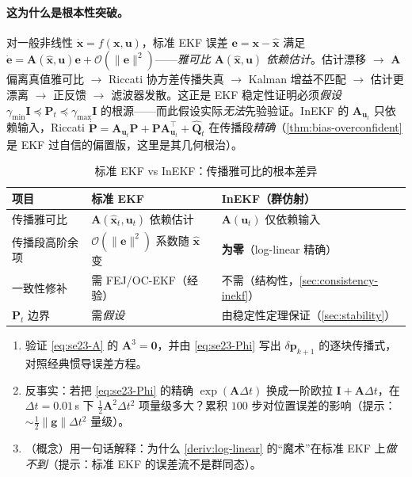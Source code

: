 \paragraph{这为什么是根本性突破。}对一般非线性 $\dot{\mathbf{x}}=f(\mathbf{x},\mathbf{u})$，标准 EKF 误差 $\mathbf{e}=\mathbf{x}-\hat{\mathbf{x}}$ 满足 $\dot{\mathbf{e}}=\mathbf{A}(\hat{\mathbf{x}},\mathbf{u})\mathbf{e}+\mathcal{O}(\|\mathbf{e}\|^2)$——\emph{雅可比 $\mathbf{A}(\hat{\mathbf{x}},\mathbf{u})$ 依赖估计}。估计漂移 $\to$ $\mathbf{A}$ 偏离真值雅可比 $\to$ Riccati 协方差传播失真 $\to$ Kalman 增益不匹配 $\to$ 估计更漂离 $\to$ 正反馈 $\to$ 滤波器发散。这正是 EKF 稳定性证明必须\emph{假设} $\gamma_{\min}\mathbf{I}\preceq\mathbf{P}_t\preceq\gamma_{\max}\mathbf{I}$ 的根源——而此假设实际\emph{无法}先验验证。InEKF 的 $\mathbf{A}_{\mathbf{u}_t}$ 只依赖输入，Riccati $\dot{\mathbf{P}}=\mathbf{A}_{\mathbf{u}_t}\mathbf{P}+\mathbf{P}\mathbf{A}_{\mathbf{u}_t}^\top+\hat{\mathbf{Q}}_t$ 在传播段\emph{精确}（\cref{thm:bias-overconfident} 是 EKF 过自信的偏置版，这里是其几何根治）。

\begin{table}[H]\centering\small
\caption{标准 EKF vs InEKF：传播雅可比的根本差异}
\label{tab:ekf-vs-inekf}
\begin{tabular}{lll}
\toprule
项目 & 标准 EKF & InEKF（群仿射） \\
\midrule
传播雅可比 & $\mathbf{A}(\hat{\mathbf{x}}_t,\mathbf{u}_t)$ 依赖估计 & $\mathbf{A}(\mathbf{u}_t)$ 仅依赖输入 \\
传播段高阶余项 & $\mathcal{O}(\|\mathbf{e}\|^2)$ 系数随 $\hat{\mathbf{x}}$ 变 & \textbf{为零}（log-linear 精确） \\
一致性修补 & 需 FEJ/OC-EKF（经验） & 不需（结构性，\cref{sec:consistency-inekf}） \\
$\mathbf{P}_t$ 边界 & 需\emph{假设} & 由稳定性定理保证（\cref{sec:stability}） \\
\bottomrule
\end{tabular}
\end{table}

\begin{practice}
\begin{enumerate}
  \item 验证 \cref{eq:se23-A} 的 $\mathbf{A}^3=\mathbf{0}$，并由 \cref{eq:se23-Phi} 写出 $\delta\mathbf{p}_{k+1}$ 的逐块传播式，对照经典惯导误差方程。
  \item 反事实：若把 \cref{eq:se23-Phi} 的精确 $\exp(\mathbf{A}\Delta t)$ 换成一阶欧拉 $\mathbf{I}+\mathbf{A}\Delta t$，在 $\Delta t=0.01\,$s 下 $\tfrac12\mathbf{A}^2\Delta t^2$ 项量级多大？累积 $100$ 步对位置误差的影响（提示：$\sim\tfrac12\|\mathbf{g}\|\Delta t^2$ 量级）。
  \item （概念）用一句话解释：为什么 \cref{deriv:log-linear} 的“魔术”在标准 EKF 上\emph{做不到}（提示：标准 EKF 的误差流不是群同态）。
\end{enumerate}
\end{practice}

